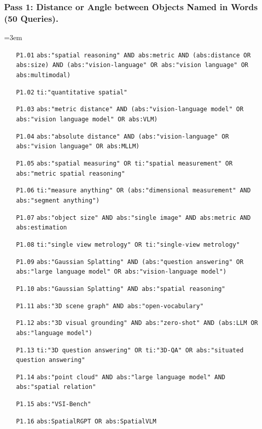 \subsubsection{Pass 1: Distance or Angle between Objects Named in Words (50 Queries).}
{\footnotesize\raggedright\emergencystretch=3em\begin{itemize}\setlength{\itemsep}{0pt}\setlength{\parskip}{0pt}
\item[\texttt{P1.01}] \texttt{abs:"spatial reasoning" AND abs:metric AND (abs:distance OR abs:size) AND (abs:"vision-language" OR abs:"vision language" OR abs:multimodal)}
\item[\texttt{P1.02}] \texttt{ti:"quantitative spatial"}
\item[\texttt{P1.03}] \texttt{abs:"metric distance" AND (abs:"vision-language model" OR abs:"vision language model" OR abs:VLM)}
\item[\texttt{P1.04}] \texttt{abs:"absolute distance" AND (abs:"vision-language" OR abs:"vision language" OR abs:MLLM)}
\item[\texttt{P1.05}] \texttt{abs:"spatial measuring" OR ti:"spatial measurement" OR abs:"metric spatial reasoning"}
\item[\texttt{P1.06}] \texttt{ti:"measure anything" OR (abs:"dimensional measurement" AND abs:"segment anything")}
\item[\texttt{P1.07}] \texttt{abs:"object size" AND abs:"single image" AND abs:metric AND abs:estimation}
\item[\texttt{P1.08}] \texttt{ti:"single view metrology" OR ti:"single-view metrology"}
\item[\texttt{P1.09}] \texttt{abs:"Gaussian Splatting" AND (abs:"question answering" OR abs:"large language model" OR abs:"vision-language model")}
\item[\texttt{P1.10}] \texttt{abs:"Gaussian Splatting" AND abs:"spatial reasoning"}
\item[\texttt{P1.11}] \texttt{abs:"3D scene graph" AND abs:"open-vocabulary"}
\item[\texttt{P1.12}] \texttt{abs:"3D visual grounding" AND abs:"zero-shot" AND (abs:LLM OR abs:"language model")}
\item[\texttt{P1.13}] \texttt{ti:"3D question answering" OR ti:"3D-QA" OR abs:"situated question answering"}
\item[\texttt{P1.14}] \texttt{abs:"point cloud" AND abs:"large language model" AND abs:"spatial relation"}
\item[\texttt{P1.15}] \texttt{abs:"VSI-Bench"}
\item[\texttt{P1.16}] \texttt{abs:SpatialRGPT OR abs:SpatialVLM}

\end{itemize}}
